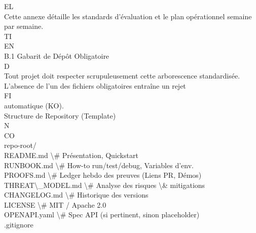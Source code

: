 \vspace{0.5em}
\vspace{0.5em}
EL\\
Cette annexe détaille les standards d’évaluation et le plan opérationnel semaine par semaine.\\
\vspace{0.5em}
\vspace{0.5em}
\vspace{0.5em}
\vspace{0.5em}
TI\\
EN\\
B.1 Gabarit de Dépôt Obligatoire\\
\vspace{0.5em}
\vspace{0.5em}
\vspace{0.5em}
\vspace{0.5em}
D\\
Tout projet doit respecter scrupuleusement cette arborescence standardisée. L’absence de l’un des fichiers obligatoires entraîne un rejet\\
\vspace{0.5em}
\vspace{0.5em}
\vspace{0.5em}
\vspace{0.5em}
FI\\
automatique (KO).\\
\vspace{0.5em}
Structure de Repository (Template)\\
N\\
CO\\
repo-root/\\
README.md                  \textbackslash{}# Présentation, Quickstart\\
RUNBOOK.md                 \textbackslash{}# How-to run/test/debug, Variables d'env.\\
PROOFS.md                  \textbackslash{}# Ledger hebdo des preuves (Liens PR, Démos)\\
THREAT\textbackslash{}_MODEL.md            \textbackslash{}# Analyse des risques \textbackslash{}& mitigations\\
CHANGELOG.md               \textbackslash{}# Historique des versions\\
LICENSE                    \textbackslash{}# MIT / Apache 2.0\\
OPENAPI.yaml               \textbackslash{}# Spec API (si pertinent, sinon placeholder)\\
.gitignore\\
